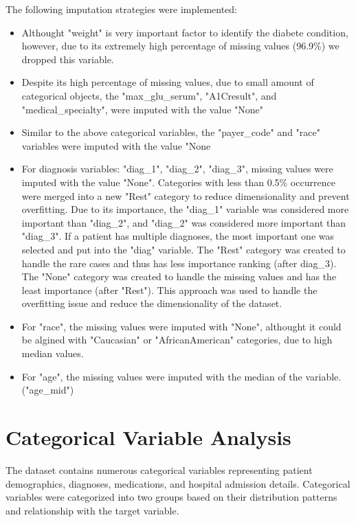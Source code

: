 The following imputation strategies were implemented:
\begin{itemize}
    \item Althought "weight" is very important factor to identify the diabete condition, however, due to its extremely high percentage of missing values (96.9\%) we dropped this variable.
    \item Despite its high percentage of missing values, due to small amount of categorical objects, the "max\_glu\_serum", "A1Cresult", and "medical\_specialty", were imputed with the value "None"
    \item Similar to the above categorical variables, the "payer\_code" and "race" variables were imputed with the value "None
    \item For diagnosis variables: "diag\_1", "diag\_2", "diag\_3", missing values were imputed with the value "None". Categories with less than 0.5\% occurrence were merged into a new "Rest" category to reduce dimensionality and prevent overfitting. 
    Due to its importance, the "diag\_1" variable was considered more important than "diag\_2", and "diag\_2" was considered more important than "diag\_3". If a patient has multiple diagnoses, the most important one was selected and put into the "diag" variable.
    The "Rest" category was created to handle the rare cases and thus has less importance ranking (after diag\_3).
    The "None" category was created to handle the missing values and has the least importance (after "Rest").
    This approach was used to handle the overfitting issue and reduce the dimensionality of the dataset.
    \item For "race", the missing values were imputed with "None", althought it could be algined with "Caucasian" or "AfricanAmerican" categories, due to high median values.
    \item For "age", the missing values were imputed with the median of the variable. ("age\_mid")
\end{itemize}

\section{Categorical Variable Analysis}

The dataset contains numerous categorical variables representing patient demographics, diagnoses, medications, and hospital admission details. Categorical variables were categorized into two groups based on their distribution patterns and relationship with the target variable.

